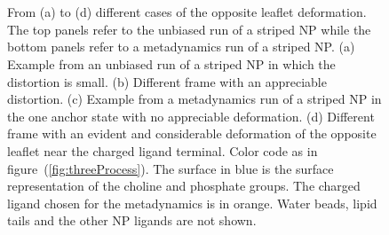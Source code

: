 \begin{figure}[ht!]
	\center
		\ %
		\\\bigskip%
		\ %
		\caption{From (a) to (d) different cases of the opposite leaflet deformation. The top panels refer to the unbiased run of a striped \ac{NP} while the bottom panels refer to a metadynamics run of a striped \ac{NP}. (a) Example from an unbiased run of a striped \acs{NP} in which the distortion is small. (b) Different frame with an appreciable distortion. (c) Example from a metadynamics run of a striped \ac{NP} in the one anchor state with no appreciable deformation. (d) Different frame with an evident and considerable deformation of the opposite leaflet near the charged ligand terminal. Color code as in figure~(\ref{fig:threeProcess}). The surface in blue is the surface representation of the choline and phosphate groups. The charged ligand chosen for the metadynamics is in orange. Water beads, lipid tails and the other \acs{NP} ligands are not shown.}%
		\label{fig:engulfmentFrame}
\end{figure}

